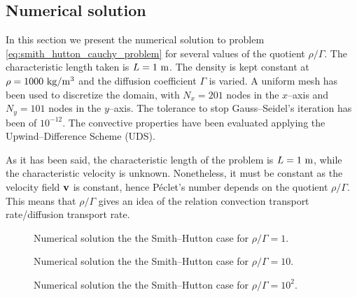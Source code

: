 
\subsection{Numerical solution}

In this section we present the numerical solution to problem \eqref{eq:smith_hutton_cauchy_problem} for several values of the quotient $\rho / \Gamma$. The characteristic length taken is $L = 1 \ \meter$. The density is kept constant at $\rho = 1000 \ \kilo\gram / \meter^3$ and the diffusion coefficient $\Gamma$ is varied. A uniform mesh has been used to discretize the domain, with $N_x = 201$ nodes in the $x$--axis and $N_y = 101$ nodes in the $y$--axis. The tolerance to stop Gauss--Seidel's iteration has been of $10^{-12}$. The convective properties have been evaluated applying the Upwind--Difference Scheme (UDS). 

As it has been said, the characteristic length of the problem is $L = 1 \ \meter$, while the characteristic velocity is unknown. Nonetheless, it must be constant as the velocity field $\vb{v}$ is constant, hence Péclet's number depends on the quotient $\rho / \Gamma$. This means that $\rho / \Gamma$ gives an idea of the relation convection transport rate/diffusion transport rate.


\begin{figure}[h]
	\centering
	
	\caption{Numerical solution the the Smith--Hutton case for $\rho / \Gamma = 1$.}
	\label{fig:smith_hutton_N201_Pe1.0e+00}
\end{figure}

\begin{figure}[h]
	\centering
	
	\caption{Numerical solution the the Smith--Hutton case for $\rho / \Gamma = 10$.}
	\label{fig:smith_hutton_N201_Pe1.0e+01}
\end{figure}

\begin{figure}[h]
	\centering
	
	\caption{Numerical solution the the Smith--Hutton case for $\rho / \Gamma = 10^2$.}
	\label{fig:smith_hutton_N201_Pe1.0e+02}
\end{figure}


